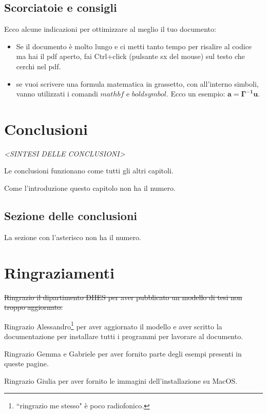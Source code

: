 \documentclass[envcountsame,envcountchap]{svmono}
\begin{document}
\section{Scorciatoie e consigli}

Ecco alcune indicazioni per ottimizzare al meglio il tuo documento:

\begin{itemize}
    \item Se il documento è molto lungo e ci metti tanto tempo
    per risalire al codice ma hai il pdf aperto, 
    fai Ctrl+click (pulsante sx del mouse) sul testo che cerchi nel pdf.
    \item se vuoi scrivere una formula matematica in grassetto, con all'interno simboli, vanno utilizzati
    i comandi $mathbf$ e $boldsymbol$. Ecco un esempio: $\mathbf{a=\boldsymbol{\Gamma}^{-1}u}$.

\end{itemize}

    


\chapter*{Conclusioni}

\vspace{2cm}

\begin{flushright}
 \textit{<SINTESI DELLE CONCLUSIONI>}
\end{flushright}

\vspace{0.5cm}

Le conclusioni funzionano come tutti gli altri capitoli.

Come l'introduzione questo capitolo non ha il numero.

\section*{Sezione delle conclusioni}
La sezione con l'asterisco non ha il numero.

\chapter*{Ringraziamenti}

\sout{Ringrazio il dipartimento DIIES per aver pubblicato un modello di tesi non troppo aggiornato.}

Ringrazio Alessandro\footnote{``ringrazio me stesso" è poco radiofonico.}
per aver aggiornato il modello e aver scritto la documentazione
per installare tutti i programmi per lavorare al documento.

Ringrazio Gemma e Gabriele per aver fornito parte degli esempi presenti in queste pagine.

Ringrazio Giulia per aver fornito le immagini dell'installazione su MacOS.






\end{document}
